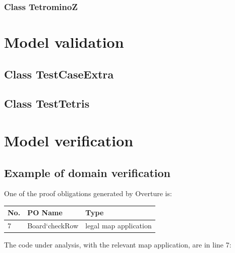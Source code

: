 \documentclass[a4paper]{article}
\begin{document}


\subsubsection{Class TetrominoZ}



\section{Model validation}

\subsection{Class TestCaseExtra} 



\subsection{Class TestTetris} 

%

\section{Model verification}

\subsection{Example of domain verification} 

One of the proof obligations generated by Overture is:

\begin{table}[!h]
	\centering
	\label{domain-verification}
	\begin{tabular}{|l|l|p{8.5cm}|}
		\hline
		No.  & PO Name & Type	\\	\hline
		7    & Board`checkRow & legal map application	\\	\hline
	\end{tabular}
\end{table}

The code under analysis, with the relevant map application, are in line 7:


\end{document}
